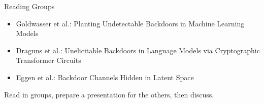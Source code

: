 \begin{frame}{Reading Groups}
\begin{itemize}
\item Goldwasser et al.: Planting Undetectable Backdoors in Machine Learning Models
\item Draguns et al.: Unelicitable Backdoors in Language Models via Cryptographic Transformer Circuits
\item Eggen et al.: Backdoor Channels Hidden in Latent Space
\end{itemize}
\vspace{1em}
Read in groups, prepare a presentation for the others, then discuss.

\end{frame}
